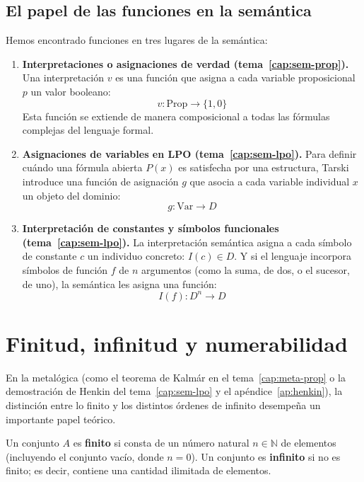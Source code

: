 \subsection{El papel de las funciones en la semántica}
Hemos encontrado funciones en tres lugares de la semántica:
\begin{enumerate}
    \item \textbf{Interpretaciones o asignaciones de verdad (tema~\ref{cap:sem-prop}).} Una interpretación $v$ es una función que asigna a cada variable proposicional $p$ un valor booleano:
    \[
    v: \text{Prop} \to \{1, 0\}
    \]
    Esta función se extiende de manera composicional a todas las fórmulas complejas del lenguaje formal.

    \item \textbf{Asignaciones de variables en LPO (tema~\ref{cap:sem-lpo}).} Para definir cuándo una fórmula abierta $P(x)$ es satisfecha por una estructura, Tarski introduce una función de asignación $g$ que asocia a cada variable individual $x$ un objeto del dominio:
    \[
    g: \text{Var} \to D
    \]

    \item \textbf{Interpretación de constantes y símbolos funcionales (tema~\ref{cap:sem-lpo}).} La interpretación semántica asigna a cada símbolo de constante $c$ un individuo concreto: $I(c) \in D$. Y si el lenguaje incorpora símbolos de función $f$ de $n$ argumentos (como la suma, de dos, o el sucesor, de uno), la semántica les asigna una función:
    \[
    I(f): D^n \to D
    \]
\end{enumerate}

\section{Finitud, infinitud y numerabilidad}

En la metalógica (como el teorema de Kalmár en el tema~\ref{cap:meta-prop} o la demostración
de Henkin del tema~\ref{cap:sem-lpo} y el apéndice~\ref{ap:henkin}), la distinción entre lo finito y los distintos
órdenes de infinito desempeña un importante papel teórico. 

\begin{definicion}
Un conjunto $A$ es \textbf{finito} si consta de un número natural $n \in \mathbb{N}$ de elementos (incluyendo el conjunto vacío, donde $n = 0$). Un conjunto es \textbf{infinito} si no es finito; es decir, contiene una cantidad ilimitada de elementos.
\end{definicion}

